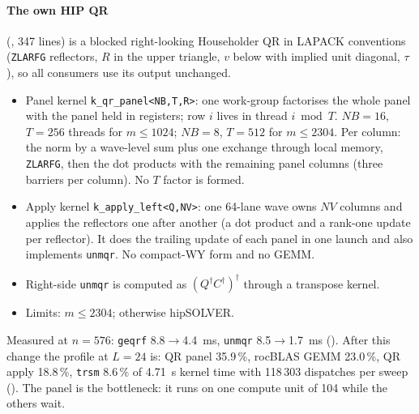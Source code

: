 \paragraph{The own HIP QR} (, 347 lines) is a blocked right-looking Householder QR in LAPACK conventions (\texttt{ZLARFG} reflectors, $R$ in the upper triangle, $v$ below with implied unit diagonal, $\tau$), so all consumers use its output unchanged.
\begin{itemize}
\item Panel kernel \texttt{k\_qr\_panel<NB,T,R>}: one work-group factorises the whole panel with the panel held in registers; row $i$ lives in thread $i \bmod T$. $NB=16$, $T=256$ threads for $m\le1024$; $NB=8$, $T=512$ for $m\le2304$. Per column: the norm by a wave-level sum plus one exchange through local memory, \texttt{ZLARFG}, then the dot products with the remaining panel columns (three barriers per column). No $T$ factor is formed.
\item Apply kernel \texttt{k\_apply\_left<Q,NV>}: one 64-lane wave owns $NV$ columns and applies the reflectors one after another (a dot product and a rank-one update per reflector). It does the trailing update of each panel in one launch and also implements \texttt{unmqr}. No compact-WY form and no GEMM.
\item Right-side \texttt{unmqr} is computed as $(Q^\dagger C^\dagger)^\dagger$ through a transpose kernel.
\item Limits: $m\le2304$; otherwise hipSOLVER.
\end{itemize}
Measured at $n=576$: \texttt{geqrf} 8.8$\to$4.4~ms, \texttt{unmqr} 8.5$\to$1.7~ms (). %
After this change the profile at $L=24$ is: QR panel 35.9\,\%, rocBLAS GEMM 23.0\,\%, QR apply 18.8\,\%, \texttt{trsm} 8.6\,\% of 4.71~s kernel time with 118\,303 dispatches per sweep (). %
The panel is the bottleneck: it runs on one compute unit of 104 while the others wait.

